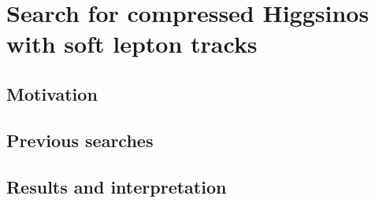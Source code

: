 \chapter{Search for compressed Higgsinos  with soft lepton tracks}

\section{Motivation}

\section{Previous searches}





















\clearpage
\section{Results and interpretation}


